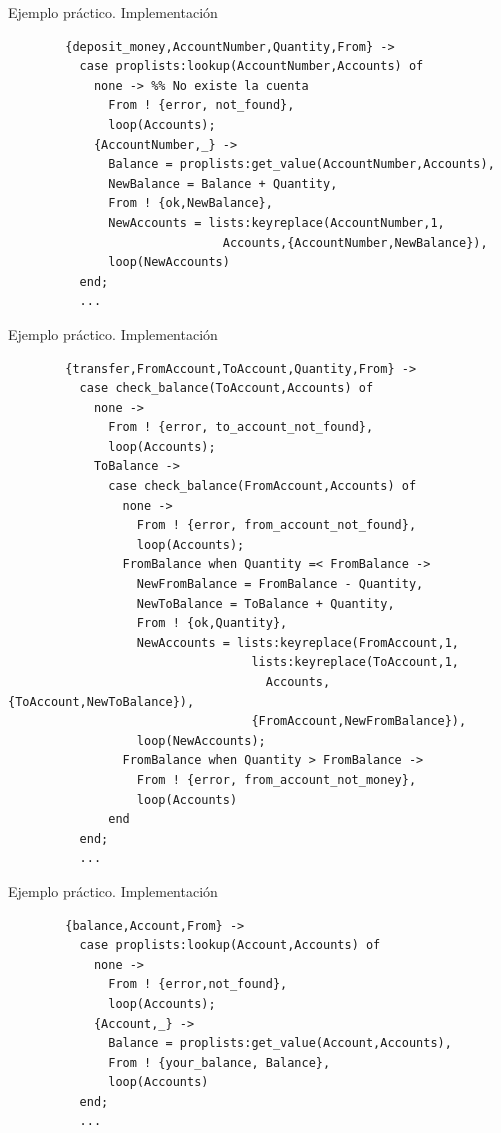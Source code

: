 \documentclass{beamer}
\begin{document}
    \begin{frame}[fragile]{Ejemplo práctico. Implementación}
      \begin{verbatim}
        {deposit_money,AccountNumber,Quantity,From} ->
          case proplists:lookup(AccountNumber,Accounts) of
            none -> %% No existe la cuenta
              From ! {error, not_found},
              loop(Accounts);
            {AccountNumber,_} ->
              Balance = proplists:get_value(AccountNumber,Accounts),
              NewBalance = Balance + Quantity,
              From ! {ok,NewBalance},
              NewAccounts = lists:keyreplace(AccountNumber,1,
                              Accounts,{AccountNumber,NewBalance}),
              loop(NewAccounts)
          end;
          ...
      \end{verbatim}
    \end{frame}

    \begin{frame}[fragile]{Ejemplo práctico. Implementación}
      \begin{verbatim}
        {transfer,FromAccount,ToAccount,Quantity,From} ->
          case check_balance(ToAccount,Accounts) of
            none ->
              From ! {error, to_account_not_found},
              loop(Accounts);
            ToBalance ->
              case check_balance(FromAccount,Accounts) of
                none ->
                  From ! {error, from_account_not_found},
                  loop(Accounts);
                FromBalance when Quantity =< FromBalance ->
                  NewFromBalance = FromBalance - Quantity,
                  NewToBalance = ToBalance + Quantity,
                  From ! {ok,Quantity},
                  NewAccounts = lists:keyreplace(FromAccount,1,
                                  lists:keyreplace(ToAccount,1,
                                    Accounts,{ToAccount,NewToBalance}),
                                  {FromAccount,NewFromBalance}),
                  loop(NewAccounts);
                FromBalance when Quantity > FromBalance ->
                  From ! {error, from_account_not_money},
                  loop(Accounts)
              end
          end;
          ...
      \end{verbatim}
    \end{frame}

    \begin{frame}[fragile]{Ejemplo práctico. Implementación}
      \begin{verbatim}
        {balance,Account,From} ->
          case proplists:lookup(Account,Accounts) of
            none ->
              From ! {error,not_found},
              loop(Accounts);
            {Account,_} ->
              Balance = proplists:get_value(Account,Accounts),
              From ! {your_balance, Balance},
              loop(Accounts)
          end;
          ...
      \end{verbatim}
    \end{frame}
\end{document}
